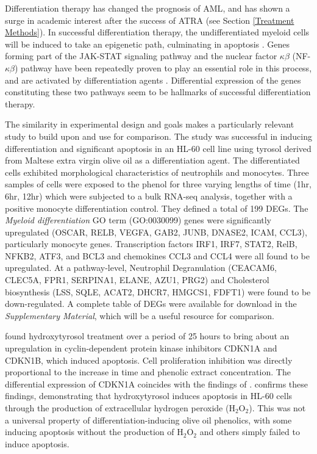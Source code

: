Differentiation therapy has changed the prognosis of \ac{AML}, and has shown a surge in academic interest after the success of \ac{ATRA} (see Section \ref{Treatment Methods}). In successful differentiation therapy, the undifferentiated myeloid cells will be induced to take an epigenetic path, culminating in apoptosis \citep{santos2000expression, mark2017transcriptomes}. Genes forming part of the JAK-STAT signaling pathway and the nuclear factor $\kappa\beta$ (NF-$\kappa\beta$) pathway have been repeatedly proven to play an essential role in this process, and are activated by differentiation agents \citep{matikainen1997retinoic, gianni1997stat1, cohen2005jak, ren2013resveratrol, iwata2016parp9}. Differential expression of the genes constituting  these two pathways seem to be hallmarks of successful differentiation therapy.

The similarity in experimental design and goals makes \cite{gatt2021tyrosol} a particularly relevant study to build upon and use for comparison. The study was successful in inducing differentiation and significant apoptosis in an HL-60 cell line using tyrosol derived from Maltese extra virgin olive oil as a differentiation agent. The differentiated cells exhibited morphological characteristics of neutrophils and monocytes. Three samples of cells were exposed to the phenol for three varying lengths of time (1hr, 6hr, 12hr) which were subjected to a bulk RNA-seq analysis, together with a positive monocyte differentiation control. They defined a total of 199 \ac{DEG}s. The \textit{Myeloid differentiation} \ac{GO} term (\ac{GO}:0030099) genes were significantly upregulated (OSCAR, RELB, VEGFA, GAB2, JUNB, DNASE2, ICAM, CCL3), particularly monocyte genes. Transcription factors IRF1, IRF7, STAT2, RelB, NFKB2, ATF3, and BCL3 and chemokines CCL3 and CCL4 were all found to be upregulated. At a pathway-level, Neutrophil Degranulation (CEACAM6, CLEC5A, FPR1, SERPINA1, ELANE, AZU1, PRG2) and Cholesterol biosynthesis (LSS, SQLE, ACAT2, DHCR7, HMGCS1, FDFT1) were found to be down-regulated. A complete table of \ac{DEG}s were available for download in the \textit{Supplementary Material}, which will be a useful resource for comparison.

\cite{fabiani2008inhibition} found hydroxytyrosol treatment over a period of 25 hours to bring about an upregulation in cyclin-dependent protein kinase inhibitors CDKN1A and CDKN1B, which induced apoptosis. Cell proliferation inhibition was directly proportional to the increase in time and phenolic extract concentration. The differential expression of CDKN1A coincides with the findings of \cite{gatt2021tyrosol}. \cite{fabiani2011production} confirms these findings, demonstrating that hydroxytyrosol induces apoptosis in HL-60 cells through the production of extracellular hydrogen peroxide (H$_2$O$_2$). This was not a universal property of differentiation-inducing olive oil phenolics, with some inducing apoptosis without the production of  H$_2$O$_2$ and others simply failed to induce apoptosis.

